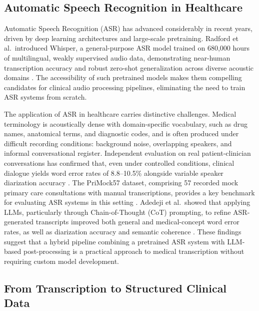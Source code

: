\subsection{Automatic Speech Recognition in Healthcare}

Automatic Speech Recognition (ASR) has advanced considerably in recent years, driven by deep learning architectures and large-scale pretraining. Radford et al.\ introduced Whisper, a general-purpose ASR model trained on 680,000 hours of multilingual, weakly supervised audio data, demonstrating near-human transcription accuracy and robust zero-shot generalization across diverse acoustic domains \cite{radford2023whisper}. The accessibility of such pretrained models makes them compelling candidates for clinical audio processing pipelines, eliminating the need to train ASR systems from scratch.

The application of ASR in healthcare carries distinctive challenges. Medical terminology is acoustically dense with domain-specific vocabulary, such as drug names, anatomical terms, and diagnostic codes, and is often produced under difficult recording conditions: background noise, overlapping speakers, and informal conversational register. Independent evaluation on real patient-clinician conversations has confirmed that, even under controlled conditions, clinical dialogue yields word error rates of 8.8--10.5\% alongside variable speaker diarization accuracy \cite{tran2022asr}. The PriMock57 dataset, comprising 57 recorded mock primary care consultations with manual transcriptions, provides a key benchmark for evaluating ASR systems in this setting \cite{papadopoulos2022primock57}. Adedeji et al.\ showed that applying LLMs, particularly through Chain-of-Thought (CoT) prompting, to refine ASR-generated transcripts improved both general and medical-concept word error rates, as well as diarization accuracy and semantic coherence \cite{adedeji2024sound}. These findings suggest that a hybrid pipeline combining a pretrained ASR system with LLM-based post-processing is a practical approach to medical transcription without requiring custom model development.

\subsection{From Transcription to Structured Clinical Data}

